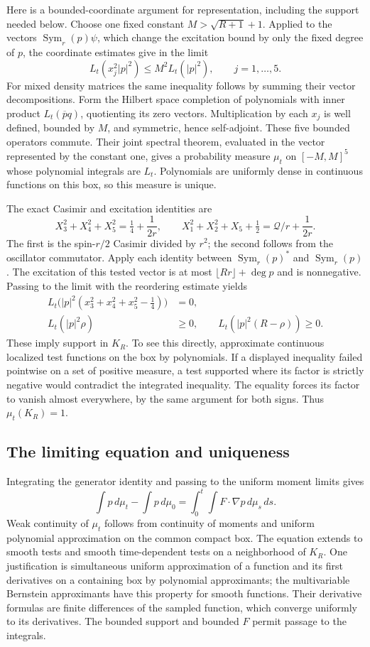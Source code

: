 \documentclass[11pt]{article}
\theoremstyle{remark}
\begin{document}
Here is a bounded-coordinate argument for representation,
including the support needed below.  Choose one fixed
constant \(M>\sqrt{R+1}+1\).  Applied to the vectors
\(\operatorname{Sym}_r(p)\psi\), which change the
excitation bound by only the fixed degree of \(p\),
the coordinate estimates give in the limit
\[
 L_t(x_j^2|p|^2)\leq M^2 L_t(|p|^2),\qquad j=1,\ldots,5 .
\]
For mixed density matrices the same inequality follows
by summing their vector decompositions.  Form the Hilbert
space completion of polynomials with inner product
\(L_t(\overline p q)\), quotienting its zero vectors.
Multiplication by each \(x_j\) is well defined, bounded
by \(M\), and symmetric, hence self-adjoint.  These five
bounded operators commute.  Their joint spectral theorem,
evaluated in the vector represented by the constant one,
gives a probability measure \(\mu_t\) on \([-M,M]^5\)
whose polynomial integrals are \(L_t\).
Polynomials are uniformly dense in continuous functions
on this box, so this measure is unique.

The exact Casimir and excitation identities are
\[
 X_3^2+X_4^2+X_5^2=\tfrac14+\frac1{2r},\qquad
 X_1^2+X_2^2+X_5+\tfrac12=\mathcal Q/r+\frac1{2r}.
\]
The first is the spin-\(r/2\) Casimir divided by \(r^2\);
the second follows from the oscillator commutator.
Apply each identity between
\(\operatorname{Sym}_r(p)^*\) and \(\operatorname{Sym}_r(p)\).
The excitation of this tested vector is at most
\(\lfloor Rr\rfloor+\deg p\) and is nonnegative.
Passing to the limit with the reordering estimate yields
\[
 \begin{aligned}
 L_t\big(|p|^2(x_3^2+x_4^2+x_5^2-\tfrac14)\big)&=0,\\
 L_t(|p|^2\rho)&\geq0,\qquad
 L_t(|p|^2(R-\rho))\geq0 .
 \end{aligned}
\]
These imply support in \(K_R\).  To see this directly,
approximate continuous localized test functions on the
box by polynomials.  If a displayed inequality failed
pointwise on a set of positive measure, a test supported
where its factor is strictly negative would contradict
the integrated inequality.  The equality forces its
factor to vanish almost everywhere, by the same argument
for both signs.  Thus \(\mu_t(K_R)=1\).

\subsection{The limiting equation and uniqueness}

Integrating the generator identity and passing to the
uniform moment limits gives
\[
 \int p\,d\mu_t-\int p\,d\mu_0
       =\int_0^t\int F\cdot\nabla p\,d\mu_s\,ds .
\]
Weak continuity of \(\mu_t\) follows from continuity of
moments and uniform polynomial approximation on the
common compact box.  The equation extends to smooth
tests and smooth time-dependent tests on a neighborhood
of \(K_R\).  One justification is simultaneous uniform
approximation of a function and its first derivatives
on a containing box by polynomial approximants; the
multivariable Bernstein approximants have this property
for smooth functions.  Their derivative formulas are
finite differences of the sampled function, which
converge uniformly to its derivatives.  The bounded
support and bounded \(F\) permit passage to the integrals.
\end{document}
